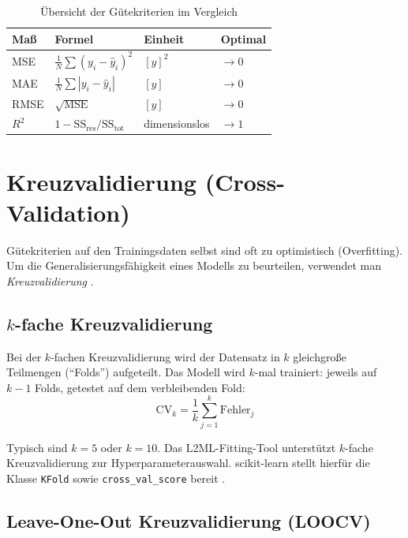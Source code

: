 \documentclass[11pt,a4paper]{report}
\begin{document}
\begin{table}[H]
\centering
\caption{\"{U}bersicht der G\"{u}tekriterien im Vergleich}
\label{tab:guetekriterien}
\begin{tabular}{p{2.2cm}p{5.8cm}p{2.2cm}p{2.0cm}}
\toprule
\textbf{Ma\ss{}} & \textbf{Formel} & \textbf{Einheit} & \textbf{Optimal} \\
\midrule
MSE  & $\frac{1}{N}\sum(y_i-\hat{y}_i)^2$  & $[y]^2$       & $\to 0$ \\
MAE  & $\frac{1}{N}\sum|y_i-\hat{y}_i|$    & $[y]$         & $\to 0$ \\
RMSE & $\sqrt{\mathrm{MSE}}$                & $[y]$         & $\to 0$ \\
$R^2$ & $1-\mathrm{SS_{res}}/\mathrm{SS_{tot}}$ & dimensionslos & $\to 1$ \\
\bottomrule
\end{tabular}
\end{table}

\section{Kreuzvalidierung (Cross-Validation)}
\label{sec:crossvalidation}

G\"{u}tekriterien auf den Trainingsdaten selbst sind oft zu optimistisch (Overfitting). Um die
Generalisierungsf\"{a}higkeit eines Modells zu beurteilen, verwendet man
\emph{Kreuzvalidierung} \cite{hastie2009, sklearn_cross_validation}.

\subsection{$k$-fache Kreuzvalidierung}

Bei der $k$-fachen Kreuzvalidierung wird der Datensatz in $k$ gleichgro\ss{}e Teilmengen
("`Folds"') aufgeteilt. Das Modell wird $k$-mal trainiert: jeweils auf $k{-}1$ Folds, getestet
auf dem verbleibenden Fold:
\begin{equation}
\mathrm{CV}_k = \frac{1}{k}\sum_{j=1}^{k} \mathrm{Fehler}_j
\end{equation}

Typisch sind $k=5$ oder $k=10$. Das L2ML-Fitting-Tool unterst\"{u}tzt $k$-fache Kreuzvalidierung zur
Hyperparameterauswahl. scikit-learn stellt hierf\"{u}r die Klasse \texttt{KFold} sowie
\texttt{cross\_val\_score} bereit \cite{sklearn_cross_validation}.

\subsection{Leave-One-Out Kreuzvalidierung (LOOCV)}
\end{document}
